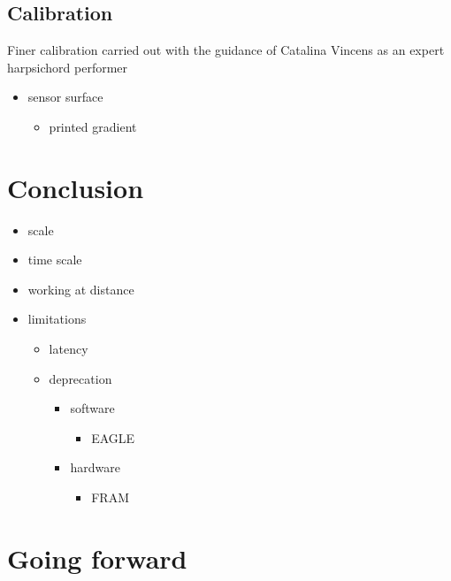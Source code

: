 \subsection{Calibration}\label{calibration}

Finer calibration carried out with the guidance of Catalina Vincens as
an expert harpsichord performer

\begin{itemize}
\item
  sensor surface

  \begin{itemize}
  \item
    printed gradient
  \end{itemize}
\end{itemize}

\section{Conclusion}\label{conclusion}

\begin{itemize}
\item
  scale
\item
  time scale
\item
  working at distance
\item
  limitations

  \begin{itemize}
  \item
    latency
  \item
    deprecation

    \begin{itemize}
    \item
      software

      \begin{itemize}
      \item
        EAGLE
      \end{itemize}
    \item
      hardware

      \begin{itemize}
      \item
        FRAM
      \end{itemize}
    \end{itemize}
  \end{itemize}
\end{itemize}

\section{Going forward}\label{going-forward}

